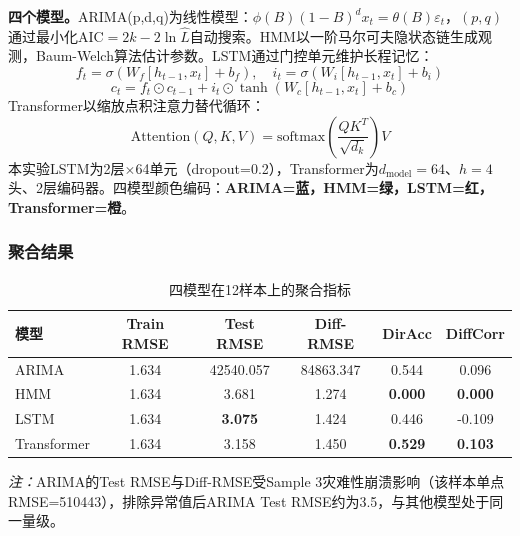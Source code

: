 \documentclass[12pt,a4paper]{article}
\begin{document}
\textbf{四个模型。}ARIMA(p,d,q)为线性模型\cite{box2015}：$\phi(B)(1-B)^d x_t = \theta(B)\varepsilon_t$，$(p,q)$通过最小化AIC$=2k-2\ln\hat{L}$自动搜索。HMM以一阶马尔可夫隐状态链生成观测\cite{rabiner1989}，Baum-Welch算法估计参数。LSTM通过门控单元维护长程记忆\cite{hochreiter1997}：
\begin{equation}
    f_t = \sigma(W_f[h_{t-1},x_t]+b_f),\quad
    i_t = \sigma(W_i[h_{t-1},x_t]+b_i)
    \label{eq:lstm_gates}
\end{equation}
\begin{equation}
    c_t = f_t\odot c_{t-1} + i_t\odot\tanh(W_c[h_{t-1},x_t]+b_c)
    \label{eq:lstm_cell}
\end{equation}
Transformer以缩放点积注意力替代循环\cite{vaswani2017}：
\begin{equation}
    \text{Attention}(Q,K,V) = \text{softmax}\!\left(\frac{QK^T}{\sqrt{d_k}}\right)V
    \label{eq:attention}
\end{equation}
本实验LSTM为2层$\times$64单元（dropout=0.2），Transformer为$d_{\text{model}}=64$、$h=4$头、2层编码器。四模型颜色编码：\textbf{ARIMA=蓝，HMM=绿，LSTM=红，Transformer=橙}。

\FloatBarrier
\subsubsection{聚合结果}

\begin{table}[htbp]
    \centering
    \caption{四模型在12样本上的聚合指标}
    \label{tab:four_models}
    \begin{tabular}{lccccc}
        \toprule
        \textbf{模型} & \textbf{Train RMSE} & \textbf{Test RMSE} & \textbf{Diff-RMSE} & \textbf{DirAcc} & \textbf{DiffCorr} \\
        \midrule
        ARIMA & 1.634 & 42540.057 & 84863.347 & 0.544 & 0.096 \\
        HMM & 1.634 & 3.681 & 1.274 & \textbf{0.000} & \textbf{0.000} \\
        LSTM & 1.634 & \textbf{3.075} & 1.424 & 0.446 & -0.109 \\
        Transformer & 1.634 & 3.158 & 1.450 & \textbf{0.529} & \textbf{0.103} \\
        \bottomrule
    \end{tabular}
\end{table}
\vspace{-6pt}
{\footnotesize \textit{注：}ARIMA的Test RMSE与Diff-RMSE受Sample 3灾难性崩溃影响（该样本单点RMSE=510443），排除异常值后ARIMA Test RMSE约为3.5，与其他模型处于同一量级。}
\end{document}
